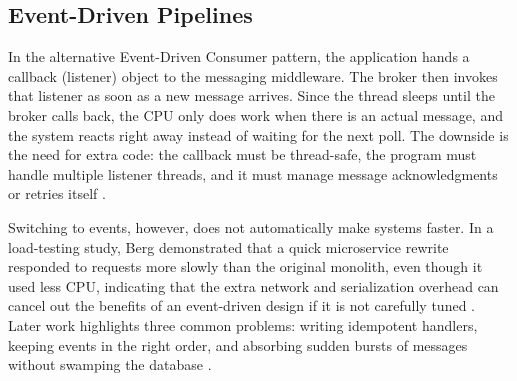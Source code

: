 \documentclass[nomenclature, english, biblatex]{kththesis}
\numberwithin{listing}{chapter}
\begin{document}
\subsection{Event-Driven Pipelines}
In the alternative Event-Driven Consumer pattern, the application hands a callback (listener) object to the messaging middleware. The broker then invokes that listener as soon as a new message arrives. 
Since the thread sleeps until the broker calls back, the CPU only does work when there is an actual message, and the system reacts right away instead of waiting for the next poll.
The downside is the need for extra code: the callback must be thread-safe, the program must handle multiple listener threads, and it must manage message acknowledgments or retries itself \cite[pp.~498–501]{Hohpe2003EIP}.

Switching to events, however, does not automatically make systems faster. In a load-testing study, Berg demonstrated that a quick microservice rewrite responded to requests more slowly than the original monolith, even though it used less CPU, indicating that the extra network and serialization overhead can cancel out the benefits of an event-driven design if it is not carefully tuned \cite{Berg2022MonolithVsMicroservices}.
Later work highlights three common problems: writing idempotent handlers, keeping events in the right order, and absorbing sudden bursts of messages without swamping the database \cite{Trindade2021EDAImpact}.



\end{document}
